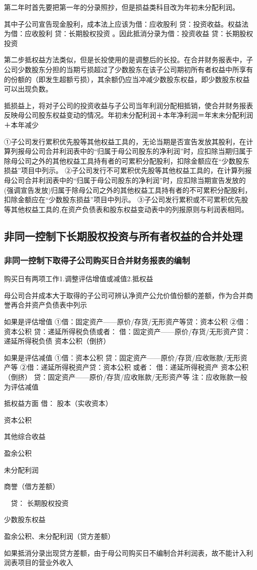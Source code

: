 \documentclass[UTF8,12pt]{ctexart}
\newenvironment{Dr}{\noindent 借：}{\par}
\newenvironment{Cr}{\noindent \ \ 贷：}{\par}
\numberwithin{equation}{section} %
\numberwithin{figure}{section}
\numberwithin{table}{section}
\begin{document}
	第二年时首先要把第一年的分录照抄，但是损益类科目改为年初未分配利润。
	
	其中子公司宣告现金股利，成本法上应该为借：应收股利 贷：投资收益。权益法为借：应收股利
	贷：长期股权投资
	。因此抵消分录为借：投资收益
	贷：长期股权投资
	
	第二步抵权益方法类似，但是长投使用的是调整后的长投。在合并财务报表中，子公司少数股东分担的当期亏损超过了少数股东在该子公司期初所有者权益中所享有的份额的（即发生超额亏损），其余额仍应当冲减少数股东权益，即少数股东权益可以出现负数。
	
	抵损益上，将对子公司的投资收益与子公司当年利润分配相抵销，使合并财务报表反映母公司股东权益变动的情况。年初未分配利润＋本年净利润＝年末未分配利润＋本年减少
	
	①子公司发行累积优先股等其他权益工具的，无论当期是否宣告发放其股利，在计算列报母公司合并利润表中的“归属于母公司股东的净利润”时，应扣除当期归属于除母公司之外的其他权益工具持有者的可累积分配股利，扣除金额应在“少数股东损益”项目中列示。
	②子公司发行不可累积优先股等其他权益工具的，在计算列报母公司合并利润表中的“归属于母公司股东的净利润”时，应扣除当期宣告发放的(强调宣告发放)归属于除母公司之外的其他权益工具持有者的不可累积分配股利，扣除金额应在“少数股东损益”项目中列示。
	③子公司发行累积或不可累积优先股等其他权益工具的,在资产负债表和股东权益变动表中的列报原则与利润表相同。
	
	\subsection{非同一控制下长期股权投资与所有者权益的合并处理}
	
	\subsubsection{非同一控制下取得子公司购买日合并财务报表的编制}
	购买日有两项工作1.调整评估增值或减值2.抵权益
	
	母公司合并成本大于取得的子公司可辨认净资产公允价值份额的差额，作为合并商誉再合并资产负债表中列示
	
	如果是评估增值
	①借：固定资产——原价/存货/无形资产等贷：资本公积
	②借：资本公积
	贷：递延所得税负债或者：
	借：固定资产——原价/存货/无形资产贷：递延所得税负债
	资本公积（倒挤）
	
	如果是评估减值
	①借：资本公积
	贷：固定资产——原价/存货/应收账款/无形资产等
	②借：递延所得税资产贷：资本公积
	或者：
	借：递延所得税资产 资本公积（倒挤）
	贷：固定资产——原价/存货/应收账款/无形资产等
	注：应收账款一般为评估减值
	
	抵权益方面
	\begin{Dr}
		股本（实收资本）
		
		资本公积
		
		其他综合收益
		
		盈余公积
		
		未分配利润
		
		商誉（借方差额）
	\end{Dr}
	\begin{Cr}
		长期股权投资
		
		少数股东权益
		
		盈余公积、未分配利润（贷方差额）
	\end{Cr}
	如果抵消分录出现贷方差额，由于母公司购买日不编制合并利润表，故不能计入利润表项目的营业外收入
\end{document}
